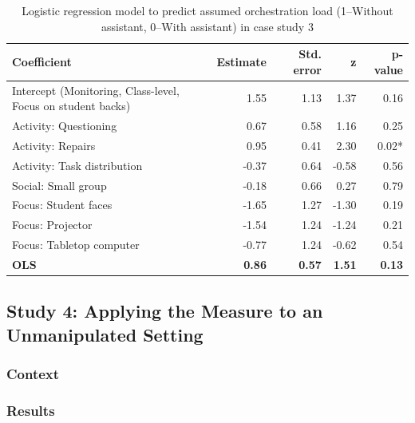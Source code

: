 \documentclass[10pt,journal,compsoc]{IEEEtran}
\begin{document}
\begin{table}[!t]
\caption{Logistic regression model to predict assumed orchestration load (1--Without assistant, 0--With assistant) in case study 3}
\label{tab:case3results}
\centering
\begin{tabular}{|p{2.8cm}||r|r|r|r|}
\hline
Coefficient & Estimate & Std. error & z & p-value\\
\hline
\hline
Intercept (Monitoring, Class-level, Focus on student backs) & 1.55 & 1.13 & 1.37 & 0.16 \\
Activity: Questioning & 0.67 & 0.58 & 1.16 & 0.25 \\
Activity: Repairs & 0.95 & 0.41 & 2.30 & 0.02* \\
Activity: Task distribution & -0.37 & 0.64 & -0.58 & 0.56 \\
Social: Small group & -0.18 & 0.66 & 0.27 & 0.79 \\
Focus: Student faces & -1.65 & 1.27 & -1.30 & 0.19 \\
Focus: Projector & -1.54 & 1.24 & -1.24 & 0.21 \\
Focus: Tabletop computer & -0.77 & 1.24 & -0.62 & 0.54 \\
\textbf{OLS} & \textbf{0.86} & \textbf{0.57} & \textbf{1.51} & \textbf{0.13} \\
\hline
\end{tabular}
\end{table}




\subsection{Study 4: Applying the Measure to an Unmanipulated Setting}
\label{sec:study4}

\subsubsection{Context}

\subsubsection{Results}
\end{document}

